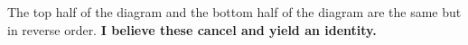 \documentclass[reqno]{amsart}
\begin{document}
The top half of the diagram and the bottom half of the diagram are the same but in reverse order. \textbf{I believe these cancel and yield an identity.}
\end{document}
